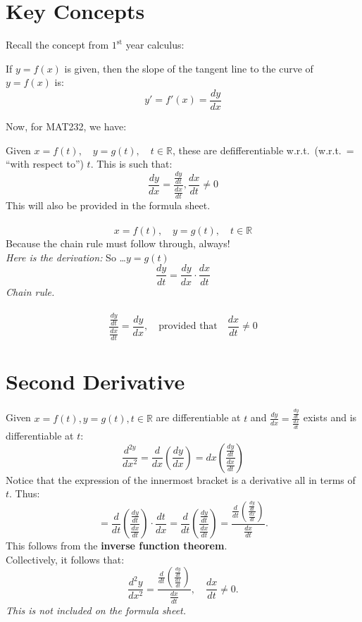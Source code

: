 \documentclass{article}
\begin{document}
\section*{Key Concepts}
Recall the concept from $1^{\text{st}}$ year calculus:
\begin{definitionbox}
If \( y = f(x) \) is given, then the slope of the tangent line to the curve of \( y = f(x) \) is:
\[
    y' = f'(x) = \frac{dy}{dx}
\]
\end{definitionbox}
Now, for MAT232, we have:
\begin{definitionbox}
Given \( x = f(t), \quad y = g(t), \quad t \in \mathbb{R} \), these are defifferentiable w.r.t.\ (w.r.t.\ = ``with respect to'') \( t \). This is such that:
\[
    \frac{dy}{dx} = \frac{\frac{dy}{dt}}{\frac{dx}{dt}}, \frac{dx}{dt} \neq 0
\]
This will also be provided in the formula sheet. \\
\\
\[
    x = f(t), \quad y = g(t), \quad t \in \mathbb{R}
\]
Because the chain rule must follow through, always! \\
\textit{Here is the derivation:}
So \dots \( y = g(t) \) \\
\[
     \frac{dy}{dt} = \frac{dy}{dx} \cdot \frac{dx}{dt}
\]
\textit{Chain rule.} \\
\\
\[
    \frac{\frac{dy}{dt}}{\frac{dx}{dt}} = \frac{dy}{dx}, \quad \text{provided that} \quad \frac{dx}{dt} \neq 0
\]
\end{definitionbox}

\section*{Second Derivative}
\begin{theorembox}
Given \( x = f(t), y = g(t), t \in \mathbb{R} \) are differentiable at \( t \) and \( \frac{dy}{dx} = \frac{\frac{dy}{dt}}{\frac{dx}{dt}} \) exists and is differentiable at \( t \):
\[
    \frac{d^{2y}}{dx^2} = \frac{d}{dx}(\frac{dy}{dx}) = dx(\frac{\frac{dy}{dt}}{\frac{dx}{dt}})
\]
Notice that the expression of the innermost bracket is a derivative all in terms of \( t \).
Thus:
\[
    = \frac{d}{dt}(\frac{\frac{dy}{dt}}{\frac{dx}{dt}}) \cdot \frac{dt}{dx} = \frac{d}{dt}(\frac{\frac{dy}{dt}}{\frac{dx}{dt}}) = \frac{\frac{d}{dt}(\frac{\frac{dy}{dt}}{\frac{dx}{dt}})}{\frac{dx}{dt}} \text{.}
\]
This follows from the \textbf{inverse function theorem}. \\
Collectively, it follows that:
\[
    \frac{d^2y}{dx^2} = \frac{\frac{d}{dt}(\frac{\frac{dy}{dt}}{\frac{dx}{dt}})}{\frac{dx}{dt}}, \quad \frac{dx}{dt} \neq 0 \text{.}
\]
\textit{This is not included on the formula sheet.}
\end{theorembox}
\end{document}
